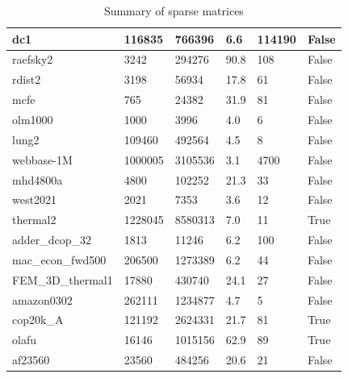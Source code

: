 \documentclass[12pt,oneside]{book} %
\begin{document}
\begin{table}[h]
\begin{tabular}{|l|l|l|l|l|l|}
        dc1                  & 116835     & 766396      & 6.6              & 114190           & False              \\ \hline
        raefsky2             & 3242       & 294276      & 90.8             & 108              & False              \\ \hline
        rdist2               & 3198       & 56934       & 17.8             & 61               & False              \\ \hline
        mcfe                 & 765        & 24382       & 31.9             & 81               & False              \\ \hline
        olm1000              & 1000       & 3996        & 4.0              & 6                & False              \\ \hline
        lung2                & 109460     & 492564      & 4.5              & 8                & False              \\ \hline
        webbase-1M           & 1000005    & 3105536     & 3.1              & 4700             & False              \\ \hline
        mhd4800a             & 4800       & 102252      & 21.3             & 33               & False              \\ \hline
        west2021             & 2021       & 7353        & 3.6              & 12               & False              \\ \hline
        thermal2             & 1228045    & 8580313     & 7.0              & 11               & True               \\ \hline
        adder\_dcop\_32      & 1813       & 11246       & 6.2              & 100              & False              \\ \hline
        mac\_econ\_fwd500    & 206500     & 1273389     & 6.2              & 44               & False              \\ \hline
        FEM\_3D\_thermal1    & 17880      & 430740      & 24.1             & 27               & False              \\ \hline
        amazon0302           & 262111     & 1234877     & 4.7              & 5                & False              \\ \hline
        cop20k\_A            & 121192     & 2624331     & 21.7             & 81               & True               \\ \hline
        olafu                & 16146      & 1015156     & 62.9             & 89               & True               \\ \hline
        af23560              & 23560      & 484256      & 20.6             & 21               & False              \\ \hline
    \end{tabular}
    \caption{Summary of sparse matrices}
    \label{tab:matrix_summary}
\end{table}
\end{document}

